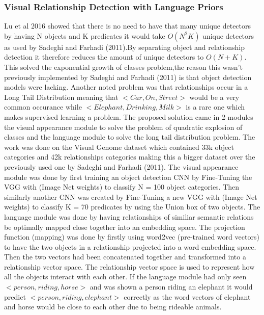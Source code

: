 \documentclass{csfyp}
\newcommand\tab[1][1cm]{\hspace*{#1}}
\begin{document}
\subsubsection{Visual Relationship Detection with Language Priors}
Lu et al 2016 showed that there is no need to have that many unique detectors by having N objects and K predicates it would take $O(N^2 K)$ unique detectors as used by Sadeghi and Farhadi (2011).By separating object and relationship detection it therefore reduces the amount of unique detectors to $O(N+K)$. This solved the exponential growth of classes problem,the reason this wasn't previously implemented by Sadeghi and Farhadi (2011) is that object detection models were lacking. Another noted problem was that relationships occur in a Long Tail Distribution meaning that $<Car,On,Street>$ would be a very common occurance while $<Elephant, Drinking , Milk>$ is a rare one which makes supervised learning a problem. The proposed solution came in 2 modules the visual appearance module to solve the problem of quadratic explosion of classes and the language module to solve the long tail distribution problem. The work was done on the Visual Genome dataset which contained 33k object categories and 42k relationships  categories making this a bigger dataset over the previously used one by Sadeghi and Farhadi (2011). 
\tab
The visual appearance module was done by first training an object detection CNN by Fine-Tuning the VGG with (Image Net weights) to classify N = 100 object categories. Then similarly another CNN was created by Fine-Tuning a new VGG with (Image Net weights) to classify K = 70 predicates by using the Union box of two objects. 
\tab
The language module was done by having relationships of similiar semantic relations be optimally mapped close together into an embedding space. The projection function (mapping) was done by firstly using word2vec (pre-trained word vectors) to have the two objects in a relationship projected into a word embedding space. Then the two vectors had been concatenated together and transformed into a relationship vector space. The relationship vector space is used to represent how all the objects interact with each other. If the language module had only seen $<person , riding , horse>$ and was shown a person riding an elephant it would predict $<person , riding , elephant>$ correctly as the word vectors of elephant and horse would be close to each other due to being rideable animals.
\\
\tab
\end{document}
